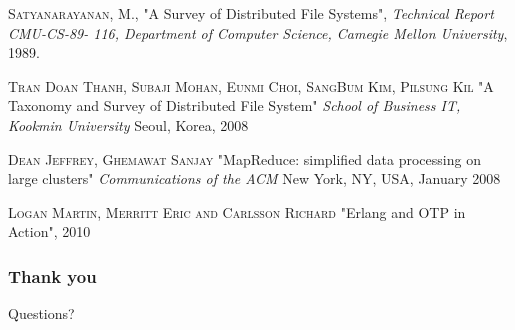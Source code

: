 \documentclass{beamer}
\makeatletter
\newcounter{multipleslide}
\newcommand{\restoreframe}
{
	\patchcmd{\beamer@@tmpl@footline}
	{\themultipleslide}
  	{\insertframenumber}
	{}
	{}
	\setcounter{framenumber}{\value{multipleslide}}
}
\makeatother
\begin{document}
\begin{frame}[allowframebreaks]
\begin{thebibliography}{99}
  \textsc{Satyanarayanan, M.},
  "A Survey of Distributed File Systems",
  \emph{Technical Report CMU-CS-89- 116, Department of Computer Science, Camegie Mellon University},
  1989.

  \textsc{Tran Doan Thanh, Subaji Mohan, Eunmi Choi, SangBum Kim, Pilsung Kil}
  "A Taxonomy and Survey of Distributed File System"
  \emph{School of Business IT, Kookmin University}
  Seoul, Korea, 2008

  \textsc{Dean Jeffrey, Ghemawat Sanjay}
  "MapReduce: simplified data processing on large clusters"
  \emph{Communications of the ACM}
  New York, NY, USA, January 2008

  \textsc{Logan Martin, Merritt Eric and Carlsson Richard}
  "Erlang and OTP in Action",
  2010
\end{thebibliography}
\end{frame}
\restoreframe

\begin{frame} \frametitle{Thank you}
\Huge{\centerline{\color{darkred}Questions?}}
\end{frame}
\end{document}
